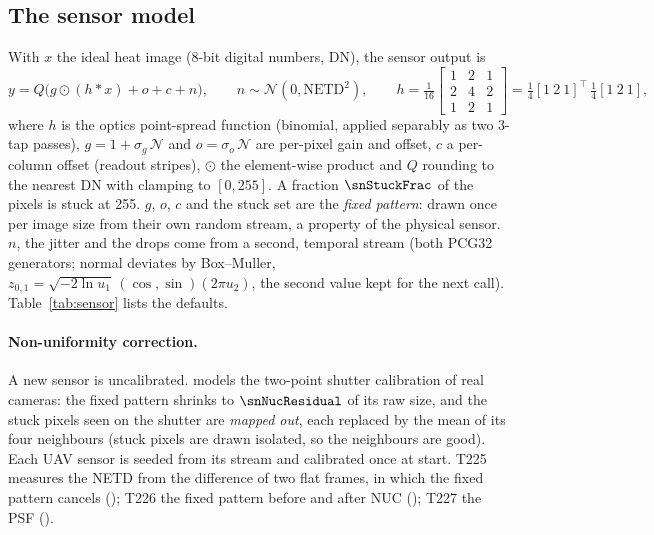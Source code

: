 \subsection{The sensor model}
With $x$ the ideal heat image (8-bit digital numbers, DN), the sensor output is
\begin{equation}
y=Q\bigl(g\odot(h*x)+o+c+n\bigr),\qquad n\sim\mathcal N(0,\text{NETD}^2),\qquad
h=\tfrac1{16}\begin{bmatrix}1&2&1\\2&4&2\\1&2&1\end{bmatrix}=\tfrac14[1\ 2\ 1]^\top\,\tfrac14[1\ 2\ 1],
\end{equation}
where $h$ is the optics point-spread function (binomial, applied separably as two 3-tap passes), $g=1+\sigma_g\,\mathcal N$ and $o=\sigma_o\,\mathcal N$ are per-pixel gain and offset, $c$ a per-column offset (readout stripes), $\odot$ the element-wise product and $Q$ rounding to the nearest DN with clamping to $[0,255]$. A fraction $\snStuckFrac$ of the pixels is stuck at 255. $g$, $o$, $c$ and the stuck set are the \emph{fixed pattern}: drawn once per image size from their own random stream, a property of the physical sensor. $n$, the jitter and the drops come from a second, temporal stream (both PCG32 generators; normal deviates by Box--Muller, $z_{0,1}=\sqrt{-2\ln u_1}\,(\cos,\sin)(2\pi u_2)$, the second value kept for the next call). Table~\ref{tab:sensor} lists the defaults.
\begin{table}[h]
\centering\small
\caption{Sensor model and CV thresholds (generated from ).}\label{tab:sensor}
\tabSensor
\end{table}

\paragraph{Non-uniformity correction.} A new sensor is uncalibrated.  models the two-point shutter calibration of real cameras: the fixed pattern shrinks to $\snNucResidual$ of its raw size, and the stuck pixels seen on the shutter are \emph{mapped out}, each replaced by the mean of its four neighbours (stuck pixels are drawn isolated, so the neighbours are good). Each UAV sensor is seeded from its stream and calibrated once at start. T225 measures the NETD from the difference of two flat frames, in which the fixed pattern cancels (); T226 the fixed pattern before and after NUC (); T227 the PSF ().
\lstSensorApply

